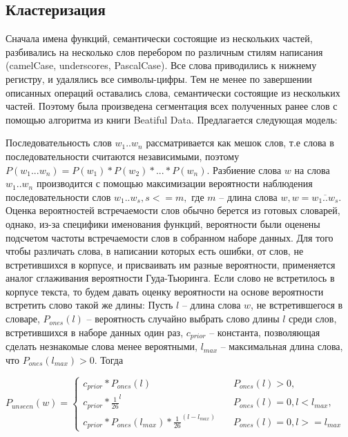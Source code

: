 \subsection{Кластеризация}
Сначала имена функций, семантически состоящие из нескольких частей, разбивались на несколько слов перебором по различным стилям написания (camelCase, underscores, PascalCase). Все слова приводились к нижнему регистру, и удалялись все символы-цифры. Тем не менее по завершении описанных операций оставались слова, семантически состоящие из нескольких частей. Поэтому была произведена сегментация всех полученных ранее слов с помощью алгоритма из книги Beatiful Data\cite{SegaranHammerbacher2009}. Предлагается следующая модель:

Последовательность слов $w_1..w_n$ рассматривается как мешок слов, т.е слова в последовательности считаются независимыми, поэтому $P(w_1...w_n) = P(w_1) * P(w_2) * ... * P(w_n)$. Разбиение слова $w$ на слова $w_1..w_n$ производится с помощью максимизации вероятности наблюдения последовательности слов $w_1..w_s, s <= m,$ где $m$ -- длина слова $w, w = \overline{w_1..w_s}$. Оценка вероятностей встречаемости слов обычно берется из готовых словарей, однако, из-за специфики именования функций, вероятности были оценены подсчетом частоты встречаемости слов в собранном наборе данных. Для того чтобы различать слова, в написании которых есть ошибки, от слов, не встретившихся в корпусе, и присваивать им разные вероятности, применяется аналог сглаживания вероятности Гуда-Тьюринга. Если слово не встретилось в корпусе текста, то будем давать оценку вероятности на основе вероятности встретить слово такой же длины:
Пусть $l$ -- длина слова $w$, не встретившегося в словаре, $P_{ones}(l)$ -- вероятность случайно выбрать слово длины $l$ среди слов, встретившихся в наборе данных один раз, $c_{prior}$ -- константа, позволяющая сделать незнакомые слова менее вероятными, $l_{max}$ -- максимальная длина слова, что $P_{ones}(l_{max}) > 0$. Тогда

$P_{unseen}(w) = \begin{cases}
c_{prior} * P_{ones}(l) & \quad P_{ones}(l) > 0 , \\
c_{prior} * \frac{1}{26}^l & \quad P_{ones}(l) = 0, l < l_{max}, \\
c_{prior} * P_{ones}(l_{max}) * \frac{1}{26}^{(l-l_{max})} & \quad P_{ones}(l) = 0, l >= l_{max}
\end{cases}$

